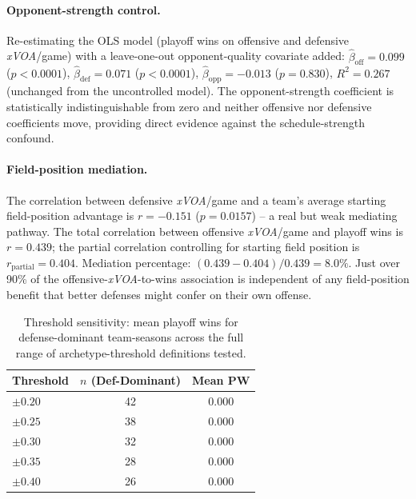 \documentclass[12pt,a4paper]{article}
\newcommand{\xvoa}{\textit{xVOA}}
\begin{document}
\paragraph{Opponent-strength control.} Re-estimating the OLS model (playoff wins on offensive
and defensive \xvoa{}/game) with a leave-one-out opponent-quality covariate added:
$\hat\beta_{\text{off}} = 0.099$ ($p<0.0001$), $\hat\beta_{\text{def}} = 0.071$ ($p<0.0001$),
$\hat\beta_{\text{opp}} = -0.013$ ($p = 0.830$), $R^2 = 0.267$ (unchanged from the uncontrolled
model). The opponent-strength coefficient is statistically indistinguishable from zero and
neither offensive nor defensive coefficients move, providing direct evidence against the
schedule-strength confound.

\paragraph{Field-position mediation.} The correlation between defensive \xvoa{}/game and a
team's average starting field-position advantage is $r = -0.151$ ($p = 0.0157$) -- a real but
weak mediating pathway. The total correlation between offensive \xvoa{}/game and playoff wins
is $r = 0.439$; the partial correlation controlling for starting field position is
$r_{\text{partial}} = 0.404$. Mediation percentage: $(0.439 - 0.404)/0.439 = 8.0\%$. Just over
90\% of the offensive-\xvoa{}-to-wins association is independent of any field-position benefit
that better defenses might confer on their own offense.

\begin{table}[htbp]
  \centering
  \caption{Threshold sensitivity: mean playoff wins for defense-dominant team-seasons across
  the full range of archetype-threshold definitions tested.}
  \begin{tabular}{lcc}
    \toprule
    \textbf{Threshold} & \textbf{$n$ (Def-Dominant)} & \textbf{Mean PW} \\
    \midrule
    $\pm0.20$ & 42 & 0.000 \\
    $\pm0.25$ & 38 & 0.000 \\
    $\pm0.30$ & 32 & 0.000 \\
    $\pm0.35$ & 28 & 0.000 \\
    $\pm0.40$ & 26 & 0.000 \\
    \bottomrule
  \end{tabular}
\end{table}
\end{document}
